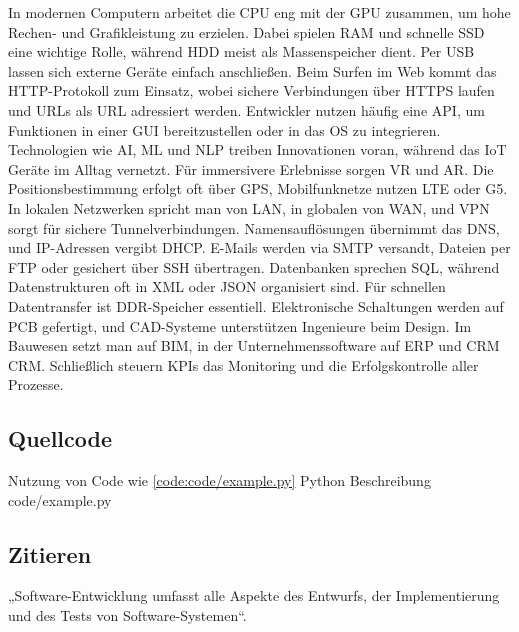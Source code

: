In modernen Computern arbeitet die \ac{CPU} eng mit der \ac{GPU} zusammen, um hohe Rechen- und Grafikleistung zu erzielen. Dabei spielen \ac{RAM} und schnelle \ac{SSD} eine wichtige Rolle, während \ac{HDD} meist als Massenspeicher dient. Per \ac{USB} lassen sich externe Geräte einfach anschließen. Beim Surfen im Web kommt das \ac{HTTP}-Protokoll zum Einsatz, wobei sichere Verbindungen über \ac{HTTPS} laufen und URLs als \ac{URL} adressiert werden. Entwickler nutzen häufig eine \ac{API}, um Funktionen in einer \ac{GUI} bereitzustellen oder in das \ac{OS} zu integrieren. Technologien wie \ac{AI}, \ac{ML} und \ac{NLP} treiben Innovationen voran, während das \ac{IoT} Geräte im Alltag vernetzt. Für immersivere Erlebnisse sorgen \ac{VR} und \ac{AR}. Die Positionsbestimmung erfolgt oft über \ac{GPS}, Mobilfunknetze nutzen \ac{LTE} oder \ac{G5}. In lokalen Netzwerken spricht man von \ac{LAN}, in globalen von \ac{WAN}, und \ac{VPN} sorgt für sichere Tunnelverbindungen. Namensauflösungen übernimmt das \ac{DNS}, und IP-Adressen vergibt \ac{DHCP}. E-Mails werden via \ac{SMTP} versandt, Dateien per \ac{FTP} oder gesichert über \ac{SSH} übertragen. Datenbanken sprechen \ac{SQL}, während Datenstrukturen oft in \ac{XML} oder \ac{JSON} organisiert sind. Für schnellen Datentransfer ist \ac{DDR}-Speicher essentiell. Elektronische Schaltungen werden auf \ac{PCB} gefertigt, und \ac{CAD}-Systeme unterstützen Ingenieure beim Design. Im Bauwesen setzt man auf \ac{BIM}, in der Unternehmens­software auf \ac{ERP} und \ac{CRM} \ac{CRM}. Schließlich steuern \ac{KPI}s das Monitoring und die Erfolgskontrolle aller Prozesse.

\subsection{Quellcode}
Nutzung von Code wie \autoref{code:code/example.py}
\flexCode
{Python}
{Beschreibung}
{code/example.py}

\subsection{Zitieren}
„Software-Entwicklung umfasst alle Aspekte des Entwurfs, der Implementierung und des Tests von Software-Systemen“. \cite{unpingcoPythonProgrammingData2021}